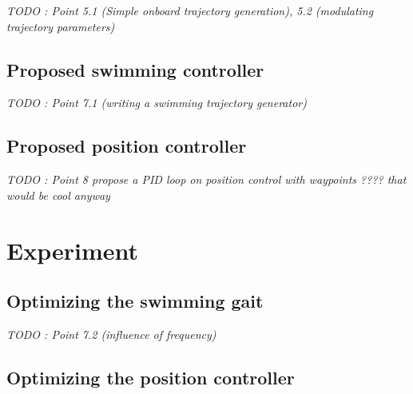 \documentclass[11pt]{article}
\begin{document}
\textit{TODO : Point 5.1 (Simple onboard trajectory generation), 5.2 (modulating trajectory parameters)}

\subsection{Proposed swimming controller}

\textit{TODO : Point 7.1 (writing a swimming trajectory generator)}

\subsection{Proposed position controller}

\textit{TODO : Point 8 propose a PID loop on position control with waypoints ???? that would be cool anyway}

\section{Experiment}

\subsection{Optimizing the swimming gait}

\textit{TODO : Point 7.2 (influence of frequency)}

\subsection{Optimizing the position controller}
\end{document}
